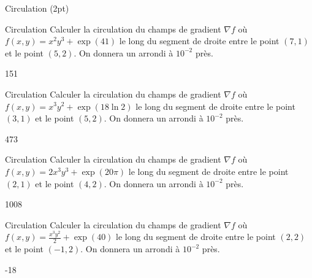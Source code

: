 \documentclass[12pt]{article}
\begin{document}
\begin{quiz}[points=2]
  {Circulation (2pt)}

  \begin{numerical}{Circulation}
    Calculer la circulation du champs de gradient $\nabla f$ o\`{u} $f(x,y) = x^2 y^3 + \exp(41)$ le long du segment de droite entre le point $(7,1)$ et le point $(5,2)$. On donnera un arrondi \`{a} $10^{-2}$ pr\`{e}s.
  \item 151
  \end{numerical}

  \begin{numerical}{Circulation}
    Calculer la circulation du champs de gradient $\nabla f$ o\`{u} $f(x,y) = x^3 y^2 + \exp(18\ln 2)$ le long du segment de droite entre le point $(3,1)$ et le point $(5,2)$.  On donnera un arrondi \`{a} $10^{-2}$ pr\`{e}s.
  \item 473
  \end{numerical}

  \begin{numerical}{Circulation}
    Calculer la circulation du champs de gradient $\nabla f$ o\`{u} $f(x,y) = 2x^3 y^3 + \exp(20\pi)$ le long du segment de droite entre le point $(2,1)$ et le point $(4,2)$. On donnera un arrondi \`{a} $10^{-2}$ pr\`{e}s.
  \item 1008
  \end{numerical}

  \begin{numerical}{Circulation}
    Calculer la circulation du champs de gradient $\nabla f$ o\`{u} $f(x,y) = \frac{x^3 y^2}{2} + \exp(40)$ le long du segment de droite entre le point $(2,2)$ et le point $(-1,2)$.  On donnera un arrondi \`{a} $10^{-2}$ pr\`{e}s.
  \item -18
  \end{numerical}
\end{quiz}





\end{document}
